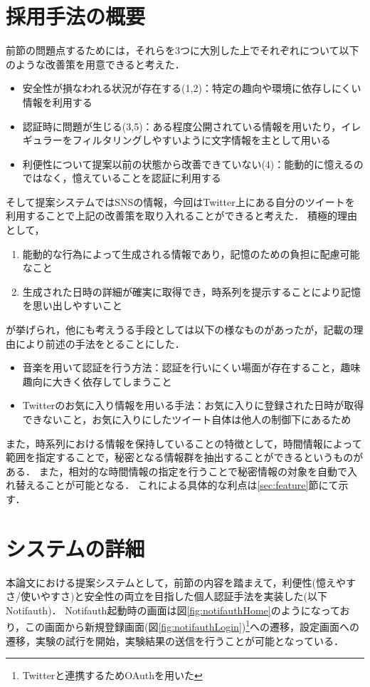 \section{採用手法の概要}
前節の問題点するためには，それらを3つに大別した上でそれぞれについて以下のような改善策を用意できると考えた．
\begin{itemize}
\item 安全性が損なわれる状況が存在する(1,2)：特定の趣向や環境に依存しにくい情報を利用する
\item 認証時に問題が生じる(3,5)：ある程度公開されている情報を用いたり，イレギュラーをフィルタリングしやすいように文字情報を主として用いる
\item 利便性について提案以前の状態から改善できていない(4)：能動的に憶えるのではなく，憶えていることを認証に利用する
\end{itemize}
そして提案システムではSNSの情報，今回はTwitter上にある自分のツイートを利用することで上記の改善策を取り入れることができると考えた．
積極的理由として，
\begin{enumerate}
\item 能動的な行為によって生成される情報であり，記憶のための負担に配慮可能なこと
\item 生成された日時の詳細が確実に取得でき，時系列を提示することにより記憶を思い出しやすいこと
\end{enumerate}
が挙げられ，他にも考えうる手段としては以下の様なものがあったが，記載の理由により前述の手法をとることにした．
\begin{itemize}
\item 音楽を用いて認証を行う方法：認証を行いにくい場面が存在すること，趣味趣向に大きく依存してしまうこと
\item Twitterのお気に入り情報を用いる手法：お気に入りに登録された日時が取得できないこと，お気に入りにしたツイート自体は他人の制御下にあるため
\end{itemize}

また，時系列における情報を保持していることの特徴として，時間情報によって範囲を指定することで，秘密となる情報群を抽出することができるというものがある．
また，相対的な時間情報の指定を行うことで秘密情報の対象を自動で入れ替えることが可能となる．
これによる具体的な利点は\ref{sec:feature}節にて示す．

\section{システムの詳細}
本論文における提案システムとして，前節の内容を踏まえて，利便性(憶えやすさ/使いやすさ)と安全性の両立を目指した個人認証手法を実装した(以下Notifauth)．
Notifauth起動時の画面は図\ref{fig:notifauthHome}のようになっており，この画面から新規登録画面(図\ref{fig:notifauthLogin})\footnote{Twitterと連携するためOAuthを用いた}への遷移，設定画面への遷移，実験の試行を開始，実験結果の送信を行うことが可能となっている．

